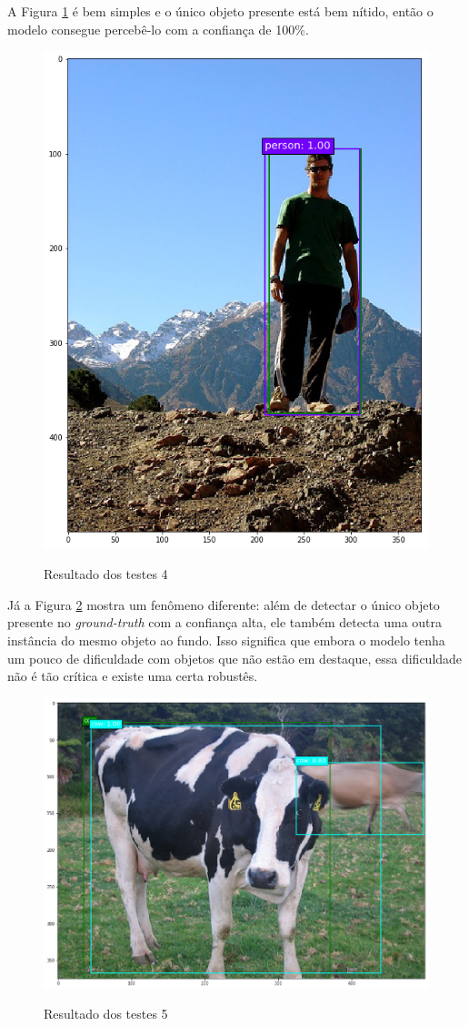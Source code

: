 A Figura \ref{fig:teste_4} é bem simples e o único objeto presente está bem nítido, então o modelo consegue percebê-lo com a confiança de 100\%.

\begin{figure}[t]
	\setlength{\abovecaptionskip}{0pt}
	\setlength{\belowcaptionskip}{0pt}
	\caption[Resultado dos testes 4]{Resultado dos testes 4}
	\centering
	\includegraphics[width=.6\textwidth]{imagem/test_image_2.png}
	\captionsetup{justification=centering}
	\label{fig:teste_4}
\end{figure}

Já a Figura \ref{fig:teste_5} mostra um fenômeno diferente: além de detectar o único objeto presente no \textit{ground-truth} com a confiança alta, ele também detecta uma outra instância do mesmo objeto ao fundo. Isso significa que embora o modelo tenha um pouco de dificuldade com objetos que não estão em destaque, essa dificuldade não é tão crítica e existe uma certa robustês.

\begin{figure}[t]
	\setlength{\abovecaptionskip}{0pt}
	\setlength{\belowcaptionskip}{0pt}
	\caption[Resultado dos testes 5]{Resultado dos testes 5}
	\centering
	\includegraphics[width=.6\textwidth]{imagem/test_image_4.png}
	\captionsetup{justification=centering}
	\label{fig:teste_5}
\end{figure}

